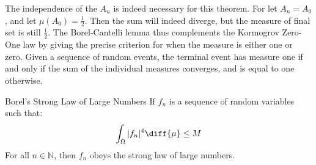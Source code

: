             The independence of the $A_{n}$ is indeed necessary for
            this theorem. For let $A_{n}=A_{0}$, and let
            $\mu(A_{0})=\frac{1}{2}$. Then the sum will indeed
            diverge, but the measure of final set is still
            $\frac{1}{2}$.
            The Borel-Cantelli lemma thus complements the
            Kormogrov Zero-One law by giving the precise criterion for
            when the measure is either one or zero. Given a sequence
            of random events, the terminal event has measure one
            if and only if the sum of the individual measures converges,
            and is equal to one otherwise.
            \begin{ltheorem}{Borel's Strong Law of Large Numbers}
                If $f_{n}$ is a sequence of random variables such that:
                \begin{equation}
                    \int_{\Omega}|f_{n}|^{4}\diff{\mu}\leq{M}
                \end{equation}
                For all $n\in\mathbb{N}$, then $f_{n}$ obeys the
                strong law of large numbers.
            \end{ltheorem}
